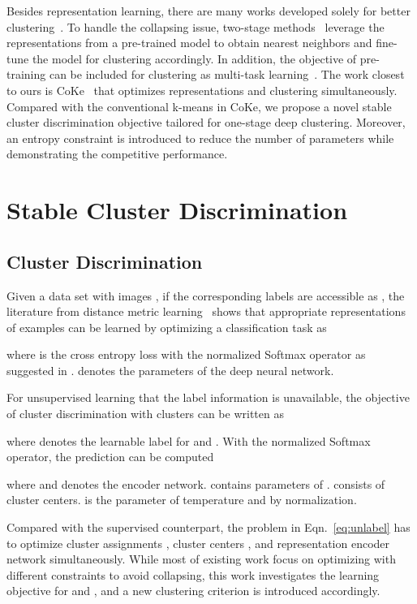 \documentclass[10pt,twocolumn,letterpaper]{article}
\begin{document}
Besides representation learning, there are many works developed solely for better clustering~\cite{DangD0WH21,GansbekeVGPG20,JiVH19,Li0LPZ021,XieGF16,YangFSH17,ZhongW0HDNL021}. To handle the collapsing issue, two-stage methods~\cite{DangD0WH21,GansbekeVGPG20,ZhongW0HDNL021} leverage the representations from a pre-trained model to obtain nearest neighbors and fine-tune the model for clustering accordingly. In addition, the objective of pre-training can be included for clustering as multi-task learning~\cite{Li0LPZ021}. The work closest to ours is CoKe~\cite{coke} that optimizes representations and clustering simultaneously. Compared with the conventional k-means in CoKe, we propose a novel stable cluster discrimination objective tailored for one-stage deep clustering. Moreover, an entropy constraint is introduced to reduce the number of parameters while demonstrating the competitive performance.

\section{Stable Cluster Discrimination}
\subsection{Cluster Discrimination}

Given a data set with  images , if the corresponding labels are accessible as , the literature from distance metric learning~\cite{QianSSHTLJ19} shows that appropriate representations of examples can be learned by optimizing a classification task as

where  is the cross entropy loss with the normalized Softmax operator as suggested in \cite{QianSSHTLJ19}.  denotes the parameters of the deep neural network.

For unsupervised learning that the label information is unavailable, the objective of cluster discrimination with  clusters can be written as

where  denotes the learnable label for  and . With the normalized Softmax operator, the prediction  can be computed 

where  and  denotes the encoder network.  contains parameters of .  consists of cluster centers.  is the parameter of temperature and  by normalization.

Compared with the supervised counterpart, the problem in Eqn.~\ref{eq:unlabel} has to optimize cluster assignments , cluster centers , and representation encoder network  simultaneously. While most of existing work focus on optimizing  with different constraints to avoid collapsing, this work investigates the learning objective for  and , and a new clustering criterion is introduced accordingly.
\end{document}
